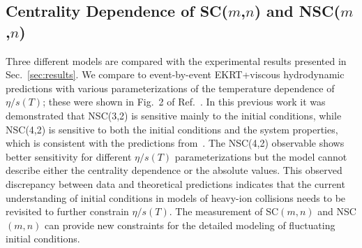 \subsection{Centrality Dependence of SC($m$,$n$) and NSC($m$,$n$)}
\label{sec:theory_allorder}
Three different models are compared with the experimental results presented in Sec.~\ref{sec:results}. 
We compare to event-by-event EKRT+viscous hydrodynamic predictions with various parameterizations of the temperature dependence of $\eta/s(T)$; these were shown in Fig.~2 of Ref.~\cite{ALICE:2016kpq}.
In this previous work it was demonstrated that NSC(3,2) is sensitive mainly to the initial conditions, while NSC(4,2) is sensitive to both the initial conditions and the system properties, which is consistent with the predictions from~\cite{Niemi:2012aj}.
The NSC(4,2) observable shows better sensitivity for different $\eta/s(T)$ parameterizations but the model cannot describe either the centrality dependence or the absolute values. This observed discrepancy between data and theoretical predictions indicates that the current understanding of initial conditions in models of heavy-ion collisions needs to be revisited to further constrain $\eta/s(T)$.
The measurement of SC$(m,n)$ and NSC$(m,n)$ can provide new constraints for the detailed modeling of fluctuating initial conditions.

